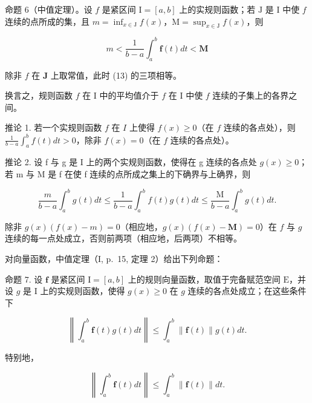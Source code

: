 命题 6（中值定理）。设 \(f\) 是紧区间 \(\mathrm{I} = [a, b]\) 上的实规则函数；若 \(\mathrm{J}\) 是 \(\mathrm{I}\) 中使 \(f\) 连续的点所成的集，且 \(m = \inf_{x \in \mathrm{J}} f(x)\)，\(\mathrm{M} = \sup_{x \in \mathrm{J}} f(x)\)，则

\[
m <   \frac {1}{b - a} \int_ {a} ^ {b} \mathbf {f} (t) d t <   \mathbf {M}\tag{13}
\]

除非 \(f\) 在 \(\mathbf{J}\) 上取常值，此时 (13) 的三项相等。

换言之，规则函数 \(f\) 在 I 中的平均值介于 \(f\) 在 I 中使 \(f\) 连续的子集上的各界之间。

推论 1. 若一个实规则函数 \(f\) 在 \(I\) 上使得 \(f(x) \geqslant 0\)（在 \(f\) 连续的各点处），则 \(\frac{1}{b - a} \int_{a}^{b} f(t) dt > 0\)，除非 \(f(x) = 0\)（在 \(f\) 连续的各点处）。

推论 2. 设 f 与 g 是 I 上的两个实规则函数，使得在 g 连续的各点处 \(g(x) \geqslant 0\)；若 m 与 M 是 f 在使 f 连续的点所成之集上的下确界与上确界，则

\[
\frac {m}{b - a} \int_ {a} ^ {b} g (t) d t \leqslant \frac {1}{b - a} \int_ {a} ^ {b} f (t) g (t) d t \leqslant \frac {\mathrm{M}}{b - a} \int_ {a} ^ {b} g (t) d t.\tag{14}
\]

除非 \(g(x)(f(x) - m) = 0\)（相应地，\(g(x)(f(x) - \mathbf{M}) = 0\)）在 \(f\) 与 \(g\) 连续的每一点处成立，否则前两项（相应地，后两项）不相等。

对向量函数，中值定理（I, p.~15, 定理 2）给出下列命题：

命题 7. 设 \(\mathbf{f}\) 是紧区间 \(\mathrm{I} = [a, b]\) 上的规则向量函数，取值于完备赋范空间 \(\mathrm{E}\)，并设 \(g\) 是 \(\mathrm{I}\) 上的实规则函数，使得 \(g(x) \geqslant 0\) 在 \(g\) 连续的各点处成立；在这些条件下

\[
\left\| \int_ {a} ^ {b} \mathbf {f} (t) g (t) d t \right\| \leqslant \int_ {a} ^ {b} \| \mathbf {f} (t) \| g (t) d t.\tag{15}
\]

特别地，

\[
\left\| \int_ {a} ^ {b} \mathbf {f} (t) d t \right\| \leqslant \int_ {a} ^ {b} \| \mathbf {f} (t) \| d t.\tag{16}
\]

